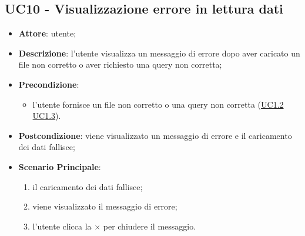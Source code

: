 \subsection{UC10 - Visualizzazione errore in lettura dati}
    \label{uc10}
    \begin{itemize}
    \item \textbf{Attore}: utente;
    \item \textbf{Descrizione}: l'utente visualizza un messaggio di errore dopo aver caricato un file non corretto o aver richiesto una query non corretta;
    \item \textbf{Precondizione}: 
    \begin{itemize}
        \item l'utente fornisce un file non corretto o una query non corretta (\hyperref[uc1.2]{UC1.2} \hyperref[uc1.3]{UC1.3}).
    \end{itemize}  
    \item \textbf{Postcondizione}: viene visualizzato un messaggio di errore e il caricamento dei dati fallisce;
    \item \textbf{Scenario Principale}: 
    \begin{enumerate}
        \item il caricamento dei dati fallisce;
        \item viene visualizzato il messaggio di errore;
        \item l'utente clicca la $\times$ per chiudere il messaggio.
    \end{enumerate}
    \end{itemize}
